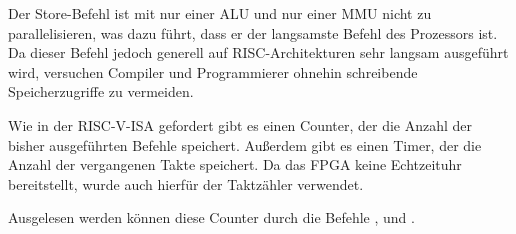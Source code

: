 
Der Store-Befehl ist mit nur einer ALU und nur einer MMU nicht zu
parallelisieren, was dazu f\"uhrt, dass er der langsamste Befehl des Prozessors
ist. Da dieser Befehl jedoch generell auf RISC-Architekturen sehr langsam
ausgef\"uhrt wird, versuchen Compiler und Programmierer ohnehin
schreibende Speicherzugriffe zu vermeiden.


Wie in der RISC-V-ISA gefordert gibt es einen Counter, der die Anzahl der
bisher ausgef\"uhrten Befehle speichert. Au\ss{}erdem gibt es einen Timer, der
die Anzahl der vergangenen Takte speichert. Da das FPGA keine Echtzeituhr
bereitstellt, wurde auch hierf\"ur der Taktz\"ahler verwendet.

Ausgelesen werden k\"onnen diese Counter durch die Befehle
\nolinebreak{},  und .

